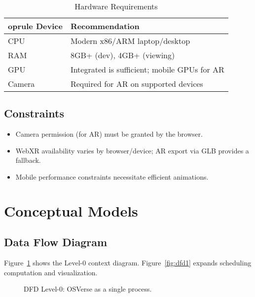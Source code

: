 \documentclass[12pt,a4paper,oneside]{report}
\begin{document}
\begin{table}[H]
  \centering
  \caption{Hardware Requirements}
  \begin{tabular}{p{} p{}}
    	oprule
    Device & Recommendation \\
    \midrule
    CPU & Modern x86/ARM laptop/desktop \\
    RAM & 8GB+ (dev), 4GB+ (viewing) \\
    GPU & Integrated is sufficient; mobile GPUs for AR \\
    Camera & Required for AR on supported devices \\
    \bottomrule
  \end{tabular}
\end{table}

\subsection{Constraints}
\begin{itemize}
  \item Camera permission (for AR) must be granted by the browser.
  \item WebXR availability varies by browser/device; AR export via GLB provides a fallback.
  \item Mobile performance constraints necessitate efficient animations.
\end{itemize}

\section{Conceptual Models}
\subsection{Data Flow Diagram}
Figure~\ref{fig:dfd0} shows the Level-0 context diagram. Figure~\ref{fig:dfd1} expands scheduling computation and visualization.

\begin{figure}[H]
  \centering
  \caption{DFD Level-0: OSVerse as a single process.}
  \label{fig:dfd0}
\end{figure}
\end{document}
